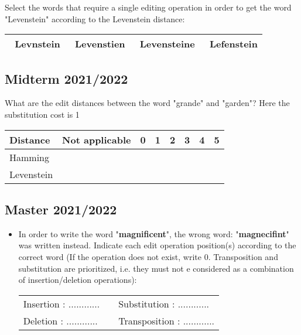 \documentclass[11pt, a4paper]{article}
\begin{document}
Select the words that require a single editing operation in order to get the word "Levenstein" according to the Levenstein distance: 
\begin{center}
	\begin{tabular}{|llll|}
		\hline
		\Square\ Levnstein & \Square\ Levenstien & \Square\ Levensteine & \Square\ Lefenstein \\
		\hline
	\end{tabular}
\end{center}

\subsection{Midterm 2021/2022}

What are the edit distances between the word "grande" and "garden"? Here the substitution cost is 1
\begin{center}
	\begin{tabular}{|l|c|c|c|c|c|c|c|}
		\hline
		Distance & Not applicable & 0 & 1 & 2 & 3 & 4 & 5 \\ \hline
		Hamming & \Circle & \Circle & \Circle & \Circle & \Circle & \Circle & \Circle \\ \hline
		Levenstein & \Circle & \Circle & \Circle & \Circle & \Circle & \Circle & \Circle \\
		\hline
	\end{tabular}
\end{center}

\subsection{Master 2021/2022}

\begin{itemize}
	\item In order to write the word "\textbf{magnificent}", the wrong word: "\textbf{magnecifint}" was written instead. 
	Indicate each edit operation position(s) according to the correct word (If the operation does not exist, write 0. 
	Transposition and substitution are prioritized, i.e. they must not e considered as a combination of insertion/deletion operations):
	\begin{center}
		\begin{tabular}{|lll|}
		\hline 
		Insertion : ............ & & Substitution  : ............ \\
		Deletion  : ............ & & Transposition : ............ \\
		\hline
	\end{tabular}
	\end{center}
	
\end{itemize}
\end{document}
